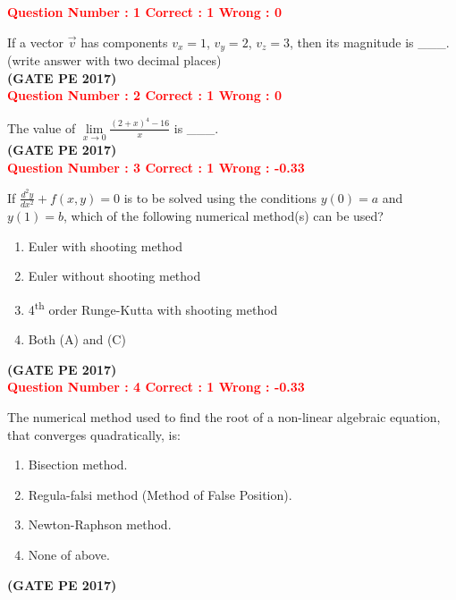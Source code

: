 \documentclass[12pt]{article}
\begin{document}
{
\Large

\textcolor{red}{\textbf{Question Number : 1 \hfill Correct : 1  Wrong : 0}}

If a vector $\vec{v}$ has components $v_x = 1$, $v_y = 2$, $v_z = 3$, then its magnitude is \_\_\_.\\
(write answer with two decimal places)\\

\hfill\textbf{(GATE PE 2017)}\\[0.6cm]


\textcolor{red}{\textbf{Question Number : 2 \hfill Correct : 1  Wrong : 0}}

The value of 
{\LARGE$
\lim\limits_{x \to 0} \frac{(2 + x)^4 - 16}{x}
$ }
is \_\_\_.\\

\hfill\textbf{(GATE PE 2017)}\\[0.6cm]


\textcolor{red}{\textbf{Question Number : 3 \hfill Correct : 1  Wrong : -0.33}}

If 
{\LARGE$
\frac{d^2 y}{dx^2} + f(x, y) = 0
$}
is to be solved using the conditions $y(0) = a$ and $y(1) = b$, which of the following numerical method(s) can be used?

\begin{enumerate}[label=(\Alph*)]
    \item Euler with shooting method
    \item Euler without shooting method
    \item 4\textsuperscript{th} order Runge-Kutta with shooting method
    \item Both (A) and (C)
\end{enumerate}
\hfill\textbf{(GATE PE 2017)}\\[0.6cm]


\textcolor{red}{\textbf{Question Number : 4 \hfill Correct : 1  Wrong : -0.33}}

The numerical method used to find the root of a non-linear algebraic equation, that converges quadratically, is:

\begin{enumerate}[label=(\Alph*)]
    \item Bisection method.
    \item Regula-falsi method (Method of False Position).
    \item Newton-Raphson method.
    \item None of above.
\end{enumerate}
\hfill\textbf{(GATE PE 2017)}\\[0.6cm]



}
\end{document}
